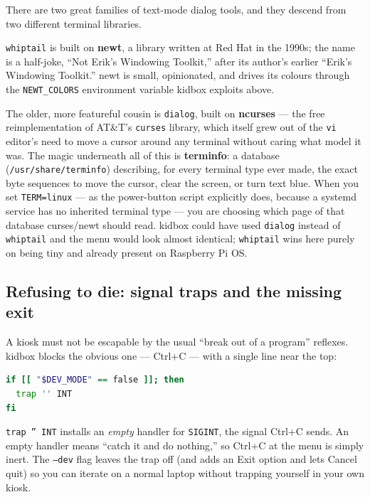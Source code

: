 \documentclass[11pt,oneside]{article}
\newcommand{\code}[1]{\texorpdfstring{\textcolor{kbblue}{\texttt{#1}}}{#1}}
\newcommand{\file}[1]{\textcolor{kbteal}{\texttt{#1}}}
\begin{document}
\begin{deeper}
There are two great families of text-mode dialog tools, and they descend from
two different terminal libraries.

\texttt{whiptail} is built on \textbf{newt}, a library written at Red Hat in the
1990s; the name is a half-joke, ``Not Erik's Windowing Toolkit,'' after its
author's earlier ``Erik's Windowing Toolkit.'' newt is small, opinionated, and
drives its colours through the \texttt{NEWT\_COLORS} environment variable
kidbox exploits above.

The older, more featureful cousin is \texttt{dialog}, built on \textbf{ncurses}
--- the free reimplementation of AT\&T's \texttt{curses} library, which itself
grew out of the \texttt{vi} editor's need to move a cursor around any terminal
without caring what model it was. The magic underneath all of this is
\textbf{terminfo}: a database (\file{/usr/share/terminfo}) describing, for every
terminal type ever made, the exact byte sequences to move the cursor, clear the
screen, or turn text blue. When you set \code{TERM=linux} --- as the
power-button script explicitly does, because a systemd service has no inherited
terminal type --- you are choosing which page of that database curses/newt
should read. kidbox could have used \texttt{dialog} instead of \texttt{whiptail}
and the menu would look almost identical; \texttt{whiptail} wins here purely on
being tiny and already present on Raspberry Pi OS.
\end{deeper}

\subsection{Refusing to die: signal traps and the missing exit}

A kiosk must not be escapable by the usual ``break out of a program'' reflexes.
kidbox blocks the obvious one --- Ctrl+C --- with a single line near the top:

\begin{lstlisting}[language=bash]
if [[ "$DEV_MODE" == false ]]; then
  trap '' INT
fi
\end{lstlisting}

\code{trap '' INT} installs an \emph{empty} handler for \texttt{SIGINT}, the
signal Ctrl+C sends. An empty handler means ``catch it and do nothing,'' so
Ctrl+C at the menu is simply inert. The \code{--dev} flag leaves the trap off
(and adds an Exit option and lets Cancel quit) so you can iterate on a normal
laptop without trapping yourself in your own kiosk.
\end{document}
